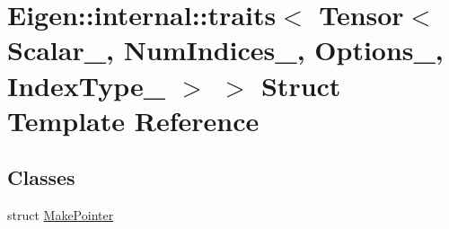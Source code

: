 \hypertarget{struct_eigen_1_1internal_1_1traits_3_01_tensor_3_01_scalar___00_01_num_indices___00_01_options___00_01_index_type___01_4_01_4}{}\section{Eigen\+:\+:internal\+:\+:traits$<$ Tensor$<$ Scalar\+\_\+, Num\+Indices\+\_\+, Options\+\_\+, Index\+Type\+\_\+ $>$ $>$ Struct Template Reference}
\label{struct_eigen_1_1internal_1_1traits_3_01_tensor_3_01_scalar___00_01_num_indices___00_01_options___00_01_index_type___01_4_01_4}
\subsection*{Classes}
\begin{DoxyCompactItemize}
\item 
struct \hyperlink{struct_eigen_1_1internal_1_1traits_3_01_tensor_3_01_scalar___00_01_num_indices___00_01_options__a867f84013967cd95c2f883b666f993d}{Make\+Pointer}
\end{DoxyCompactItemize}
